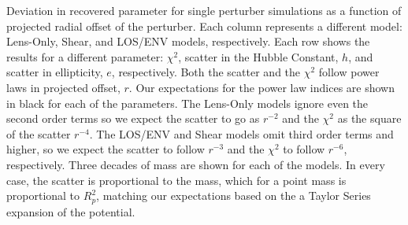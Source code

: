\label{fig:toyr3} Deviation in recovered parameter for single perturber simulations as a function of projected radial offset of the perturber. Each column represents a different model: Lens-Only, Shear, and LOS/ENV models, respectively. Each row shows the results for a different parameter: $\chi^2$, scatter in the Hubble Constant, $h$, and scatter in ellipticity, $e$, respectively. Both the scatter and the $\chi^2$ follow power laws in projected offset, $r$. Our expectations for the power law indices are shown in black for each of the parameters. The Lens-Only models ignore even the second order terms so we expect the scatter to go as $r^{-2}$ and the $\chi^2$ as the square of the scatter $r^{-4}$. The LOS/ENV and Shear models omit third order terms and higher, so we expect the scatter to follow $r^{-3}$ and the $\chi^2$ to follow $r^{-6}$, respectively. Three decades of mass are shown for each of the models. In every case, the scatter is proportional to the mass, which for a point mass is proportional to $R_p^2$, matching our expectations based on the a Taylor Series expansion of the potential.